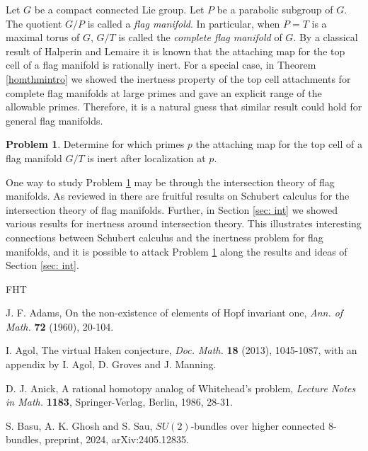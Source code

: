 \documentclass[a4]{amsart}
\theoremstyle{definition}
\newtheorem{problem}[theorem]{Problem}
\begin{document}
\begin{sloppypar}
Let $G$ be a compact connected Lie group. Let $P$ be a parabolic subgroup of $G$. The quotient $G/P$ is called a {\it flag manifold}. In particular, when $P=T$ is a maximal torus of $G$, $G/T$ is called the {\it complete flag manifold} of $G$. By a classical result of Halperin and Lemaire \cite{HL87} it is known that the attaching map for the top cell of a flag manifold is rationally inert. 
For a special case, in Theorem \ref{homthmintro} we showed the inertness property of the top cell attachments for complete flag manifolds at large primes and gave an explicit range of the allowable primes. Therefore, it is a natural guess that similar result could hold for general flag manifolds.
\begin{problem}\label{flag-inert-prob}
Determine for which primes $p$ the attaching map for the top cell of a flag manifold $G/T$ is inert after localization at $p$. 
\end{problem}
One way to study Problem \ref{flag-inert-prob} may be through the intersection theory of flag manifolds. As reviewed in \cite{DZ22} there are fruitful results on Schubert calculus for the intersection theory of flag manifolds. Further, in Section \ref{sec: int} we showed various results for inertness around intersection theory. This illustrates interesting connections between Schubert calculus and the inertness problem for flag manifolds, and it is possible to attack Problem \ref{flag-inert-prob} along the results and ideas of Section \ref{sec: int}. 



\newpage


\begin{thebibliography}{FHT}

 J. F. Adams, On the non-existence of elements of Hopf invariant one,  \emph{Ann. of Math.} \textbf{72} (1960), 20-104.

 I. Agol, The virtual Haken conjecture, \emph{Doc. Math.} \textbf{18} (2013), 1045-1087, with an appendix by I. Agol, D. Groves and J. Manning. 

 D. J. Anick, A rational homotopy analog of Whitehead's problem, \emph{Lecture Notes in Math.} \textbf{1183}, Springer-Verlag, Berlin, 1986, 28-31.

 S. Basu, A. K. Ghosh and S. Sau, $SU(2)$-bundles over higher connected $8$-bundles, preprint, 2024, arXiv:2405.12835. 


\end{thebibliography}
\end{sloppypar}
\end{document}
